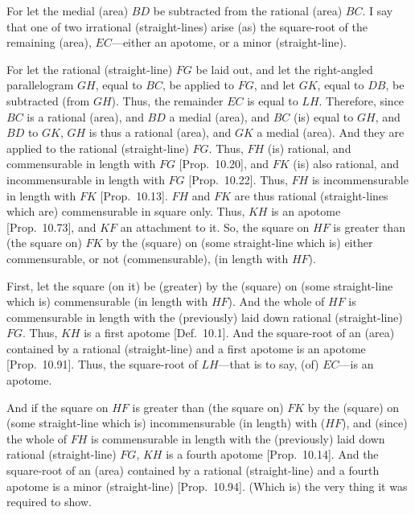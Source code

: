 \begin{Parallel}{}{}
{For let the medial (area) $BD$ be subtracted from the
rational (area) $BC$. I say that  one of two irrational (straight-lines) arise
(as) the square-root of the
remaining (area), $EC$---either
an apotome, or a minor (straight-line).

For let the rational (straight-line) $FG$ be laid out,
and let the right-angled parallelogram $GH$, equal to $BC$, 
be applied to $FG$, and let $GK$, equal to $DB$, 
be subtracted (from $GH$).  Thus, the remainder $EC$
is equal to $LH$. Therefore, since $BC$
is a rational (area), and $BD$ a medial (area), and $BC$
(is) equal to $GH$, and $BD$ to $GK$, $GH$ is thus a rational (area),
and $GK$ a medial (area). And they are applied to the rational (straight-line)
$FG$. Thus, $FH$ (is) rational, and commensurable in length with $FG$
[Prop.~10.20], and $FK$ (is) also rational, and
incommensurable in length with $FG$ [Prop.~10.22]. Thus, $FH$ is incommensurable
in length with $FK$ [Prop.~10.13]. 
$FH$ and $FK$ are thus rational (straight-lines which are) commensurable
in square only. Thus, $KH$ is an apotome [Prop.~10.73], and $KF$ an attachment to it.
So, the square on $HF$ is  greater than (the square on) $FK$ by
the (square) on (some straight-line which is) either commensurable,
or not (commensurable), (in length with $HF$).

First, let the square (on it) be (greater) by the (square) on  (some straight-line
which is) commensurable
(in length with $HF$). And the whole of $HF$ is commensurable
in length with the (previously) laid down rational (straight-line) $FG$. 
Thus, $KH$ is a first apotome [Def.~10.1]. And
the square-root of an (area) contained by a rational (straight-line)
and a first apotome is an apotome [Prop.~10.91]. 
Thus, the square-root of $LH$---that is to say, (of) $EC$---is an apotome.

And if the square on  $HF$ is greater than (the square on) $FK$ by the
(square) on (some straight-line which is) incommensurable (in length) with ($HF$),
and (since) the whole of $FH$ is commensurable in length with
the (previously) laid down rational (straight-line) $FG$, $KH$ is a fourth
apotome [Prop.~10.14]. And the square-root
of an (area) contained by a rational (straight-line) and a fourth apotome
is a minor (straight-line)
[Prop.~10.94]. (Which is) the very thing it was required to show.}
\end{Parallel}

